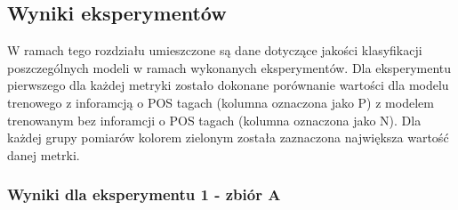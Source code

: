 \newpage %
\subsection{Wyniki eksperymentów} \label{wyniki_eksperymentow}

W ramach tego rozdziału umieszczone są dane dotyczące jakości klasyfikacji poszczególnych modeli w ramach wykonanych eksperymentów. Dla eksperymentu pierwszego dla każdej metryki zostało dokonane porównanie wartości dla modelu trenowego z inforamcją o POS tagach (kolumna oznaczona jako P) z modelem trenowanym bez inforamcji o POS tagach (kolumna oznaczona jako N). Dla każdej grupy pomiarów kolorem zielonym została zaznaczona największa wartość danej metrki.

\newpage
\subsubsection{\label{wyniki_eksperymentow_eks_1}Wyniki dla eksperymentu 1 - zbiór A}


